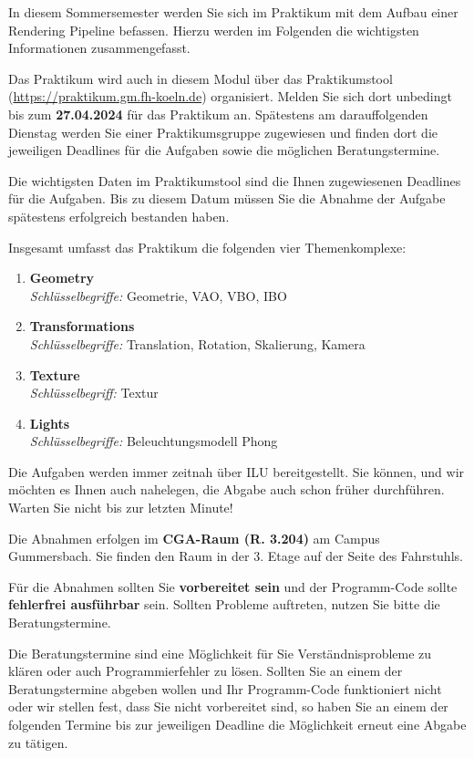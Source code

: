 \documentclass{CG2}
\begin{document}
\Header

In diesem Sommersemester werden Sie sich im Praktikum mit dem Aufbau einer Rendering Pipeline befassen. 
Hierzu werden im Folgenden die wichtigsten Informationen zusammengefasst.

Das Praktikum wird auch in diesem Modul über das Praktikumstool (\url{https://praktikum.gm.fh-koeln.de}) organisiert. 
Melden Sie sich dort unbedingt bis zum \textbf{27.04.2024} für das Praktikum an. 
Spätestens am darauffolgenden Dienstag werden Sie einer Praktikumsgruppe zugewiesen und finden dort die jeweiligen Deadlines für die Aufgaben sowie die möglichen Beratungstermine.


Die wichtigsten Daten im Praktikumstool sind die Ihnen zugewiesenen Deadlines für die Aufgaben. Bis zu diesem Datum müssen Sie die Abnahme der Aufgabe spätestens erfolgreich bestanden haben.
 
Insgesamt umfasst das Praktikum die folgenden vier Themenkomplexe:
\begin{enumerate}
	\item \textbf{Geometry} \hfill\\\textit{Schlüsselbegriffe:} Geometrie, VAO, VBO, IBO
	\item \textbf{Transformations} \hfill\\\textit{Schlüsselbegriffe:} Translation, Rotation, Skalierung, Kamera
	\item \textbf{Texture} \hfill\\\textit{Schlüsselbegriff:} Textur
	\item \textbf{Lights} \hfill\\\textit{Schlüsselbegriffe:} Beleuchtungsmodell Phong
\end{enumerate}

Die Aufgaben werden immer zeitnah über ILU bereitgestellt. Sie können, und wir möchten es Ihnen auch nahelegen, die Abgabe auch schon früher durchführen. Warten Sie nicht bis zur letzten Minute!



Die Abnahmen erfolgen im \textbf{CGA-Raum (R. 3.204)} am Campus Gummersbach. Sie finden den Raum in der 3. Etage auf der Seite des Fahrstuhls.

Für die Abnahmen sollten Sie \textbf{vorbereitet sein} und der Programm-Code sollte \textbf{fehlerfrei ausführbar} sein. Sollten Probleme auftreten, nutzen Sie bitte die
Beratungstermine.  

Die Beratungstermine sind eine Möglichkeit für Sie Verständnisprobleme zu klären oder auch Programmierfehler zu lösen. Sollten Sie an einem der Beratungstermine abgeben wollen und Ihr Programm-Code funktioniert nicht oder wir stellen fest, dass Sie nicht vorbereitet sind, so haben Sie an einem der folgenden Termine bis zur jeweiligen Deadline die Möglichkeit erneut eine Abgabe zu tätigen.
\end{document}
